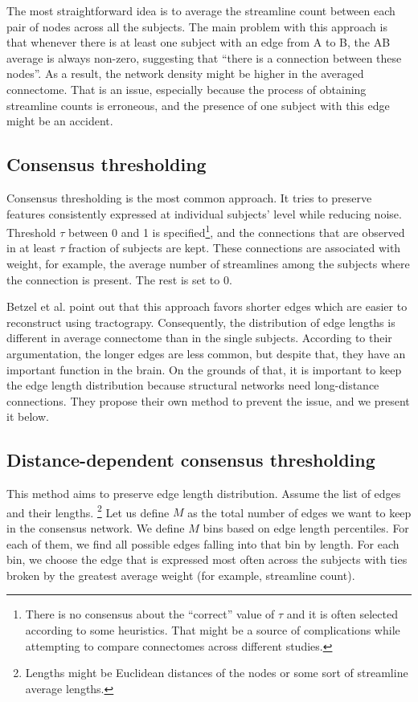 The most straightforward idea is to average the streamline count between each pair of nodes across all the subjects. The main problem with this approach is that whenever there is at least one subject with an edge from A to B, the AB average is always non-zero, suggesting that \enquote{there is a connection between these nodes}. As a result, the network density might be higher in the averaged connectome. That is an issue, especially because the process of obtaining streamline counts is erroneous, and the presence of one subject with this edge might be an accident.

\subsection{Consensus thresholding}\label{sec:cons-thr}

Consensus thresholding is the most common approach. It tries to preserve features consistently expressed at individual subjects' level while reducing noise. Threshold $\tau$ between 0 and 1 is specified\footnote{There is no consensus about the \enquote{correct} value of $\tau$ and it is often selected according to some heuristics. That might be a source of complications while attempting to compare connectomes across different studies.}, and the connections that are observed in at least $\tau$ fraction of subjects are kept. These connections are associated with weight, for example, the average number of streamlines among the subjects where the connection is present. The rest is set to 0. \cite{betzel_distance-dependent_2019}

Betzel et al. point out that this approach favors shorter edges which are easier to reconstruct using tractograpy. Consequently, the distribution of edge lengths is different in average connectome than in the single subjects. According to their argumentation, the longer edges are less common, but despite that, they have an important function in the brain. On the grounds of that, it is important to keep the edge length distribution because structural networks need long-distance connections. They propose their own method to prevent the issue, and we present it below. \cite{betzel_distance-dependent_2019} 

\subsection{Distance-dependent consensus thresholding}\label{sec:dist-dep}

This method aims to preserve edge length distribution. Assume the list of edges and their lengths. \footnote{Lengths might be Euclidean distances of the nodes or some sort of streamline average lengths.} Let us define $M$ as the total number of edges we want to keep in the consensus network. We define $M$ bins based on edge length percentiles. For each of them, we find all possible edges falling into that bin by length. For each bin, we choose the edge that is expressed most often across the subjects with ties broken by the greatest average weight (for example, streamline count). \cite{betzel_distance-dependent_2019} 

